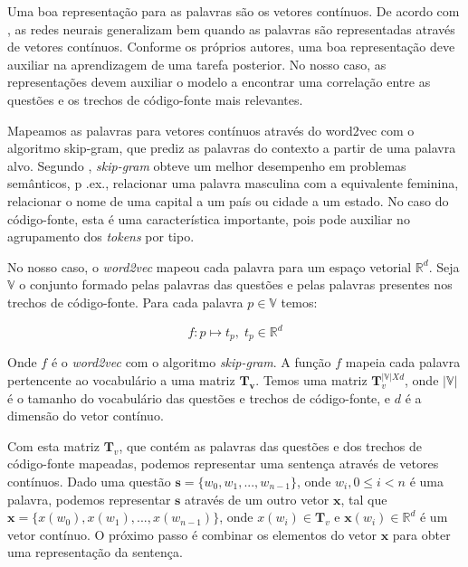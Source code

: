 Uma boa representação para as palavras são os vetores contínuos. De acordo com , as redes neurais generalizam bem quando as palavras são representadas através de vetores contínuos. Conforme os próprios autores, uma boa representação deve auxiliar na aprendizagem de uma tarefa posterior. No nosso caso, as representações devem auxiliar o modelo a encontrar uma correlação entre as questões e os trechos de código-fonte mais relevantes.

Mapeamos as palavras para vetores contínuos através do \gls{word2vec} com o algoritmo \gls{skip-gram}, que prediz as palavras do contexto a partir de uma palavra alvo. Segundo , \textit{skip-gram} obteve um melhor desempenho em problemas semânticos, p .ex., relacionar uma palavra masculina com a equivalente feminina, relacionar o nome de uma capital a um país ou cidade a um estado. No caso do código-fonte, esta é uma característica importante, pois pode auxiliar no agrupamento dos \textit{tokens} por tipo. 

No nosso caso, o \textit{word2vec} mapeou cada palavra para um espaço vetorial $\mathbb{R}^{d}$. Seja $\mathbb{V}$ o conjunto formado pelas palavras das questões e pelas palavras presentes nos trechos de código-fonte. Para cada palavra ${p} \in \mathbb{V}$ temos:

\begin{equation}
    f: {p} \mapsto t_{p},\; t_{p} \in \mathbb{R}^{d}
\end{equation}

Onde $f$ é o \textit{word2vec} com o algoritmo \textit{skip-gram}. A função $f$ mapeia cada palavra pertencente ao vocabulário a uma matriz $\bm{T_{v}}$.
Temos uma matriz $\bm{T}_{v}^{|\mathbb{V}| X d}$, onde $|\mathbb{V}|$ é o tamanho do vocabulário das questões e trechos de código-fonte, e $d$ é a dimensão do vetor contínuo.

Com esta matriz $\bm{T}_{v}$, que contém as palavras das questões e dos trechos de código-fonte mapeadas, podemos representar uma sentença através de vetores contínuos. Dado uma questão $\bm{s} = \{ w_{0}, w_{1}, . . ., w_{n - 1}\}$, onde $w_{i}, 0 \leq i < n$ é uma palavra, podemos representar $\bm{s}$ através de um outro vetor $\bm{x}$, tal que $\bm{x} = \{ x(w_{0}), x(w_{1}), . . ., x(w_{n - 1})\}$, onde $x(w_{i}) \in \bm{T}_{v}$ e $\bm{x}(w_{i}) \in \mathbb{R}^{d}$ é um vetor contínuo. O próximo passo é combinar os elementos do vetor $\bm{x}$ para obter uma representação da sentença.


